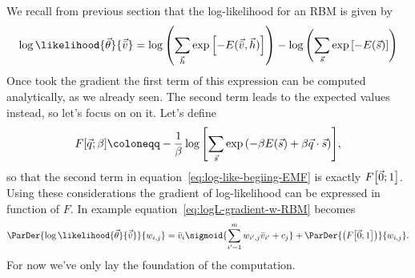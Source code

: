 We recall from previous section that the log-likelihood for an RBM is given by
\begin{equation} \label{eq:log-like-begiing-EMF}
  \log\likelihood{\vec{\theta}}{\vec{\bar{v}}}
    = \log\left(\sum_{\vec{h}} \exp\left[-E(\vec{\bar{v}},\vec{h})\right]\right)
      - \log\left(\sums \exp\left[-E(\vec{s})\right]\right)
\end{equation}
Once took the gradient the first term of this expression can be computed analytically,
as we already seen. The second term leads to the expected values instead, so let's
focus on on it. Let's define
\begin{equation} \label{eq:def-F}
  \FEn{\vec{q}}{\beta} \coloneqq - \frac{1}{\beta}
                           \log{\left[\sums \exp{\left(-\beta E(\vec{s}) + \beta \vec{q}\cdot\vec{s}\right)}\right]},
\end{equation}
so that the second term in equation~\eqref{eq:log-like-begiing-EMF} is exactly
\(F{\left[\vec{0};1\right]}\).
Using these considerations the gradient of log-likelihood can be expressed in function of
\(F\). In example equation~\eqref{eq:logL-gradient-w-RBM} becomes
\[
  \ParDer{\log\likelihood{\vec{\theta}}{\vec{\bar{v}}}}{w_{i,j}} =
    \bar{v}_i \sigmoid{\sum_{i'=1}^m w_{i',j}\bar{v}_{i'}+c_j}
    +\ParDer{\left(\FEn{\vec{0}}{1}\right)}{w_{i,j}}.
\]
For now we've only lay the foundation of the computation.


